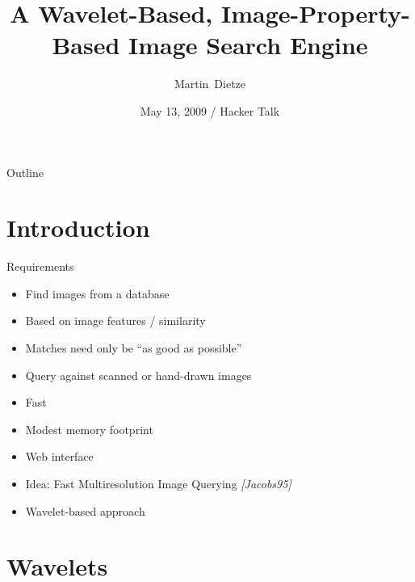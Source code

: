 \documentclass{beamer}
\title[Wavelet-Based Image Search] %
{A Wavelet-Based, Image-Property-Based Image Search Engine}
\author{Martin~Dietze}
\institute{Freiheit.com Technologies}
\date[Short Occasion] %
{May 13, 2009 / Hacker Talk}
\begin{document}
\begin{frame}
  \titlepage
\end{frame}

\begin{frame}{Outline}
  \tableofcontents
\end{frame}



\section{Introduction}

\begin{frame}{Requirements}

  \begin{itemize}
  \item Find images from a database
  \item Based on image features / similarity
  \item Matches need only be ``as good as possible''
  \item Query against scanned or hand-drawn images
  \end{itemize}

  \pause
  \begin{itemize}
  \item Fast
  \item Modest memory footprint
  \item Web interface
  \end{itemize}

  \pause
  \begin{itemize}
  \item Idea: Fast Multiresolution Image Querying \emph{[Jacobs95]}
  \item Wavelet-based approach
  \end{itemize}
\end{frame}

\section{Wavelets}
\end{document}
